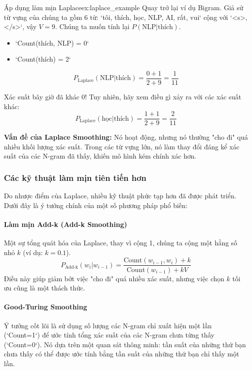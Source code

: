 \begin{example}{Áp dụng làm mịn Laplace}{ex:laplace_example}
    Quay trở lại ví dụ Bigram. Giả sử từ vựng của chúng ta gồm 6 từ: `tôi, thích, học, NLP, AI, rất, vui` cộng với `<s>, </s>`, vậy $V=9$.
    Chúng ta muốn tính lại $P(\text{NLP}|\text{thích})$.
    \begin{itemize}
        \item `Count(thích, NLP) = 0`
        \item `Count(thích) = 2`
    \end{itemize}
    
    $$ P_{\text{Laplace}}(\text{NLP} | \text{thích}) = \frac{0 + 1}{2 + 9} = \frac{1}{11} $$
    
    Xác suất bây giờ đã khác 0! Tuy nhiên, hãy xem điều gì xảy ra với các xác suất khác:
    $$ P_{\text{Laplace}}(\text{học} | \text{thích}) = \frac{1 + 1}{2 + 9} = \frac{2}{11} $$
    
    \textbf{Vấn đề của Laplace Smoothing:} Nó hoạt động, nhưng nó thường "cho đi" quá nhiều khối lượng xác suất. Trong các từ vựng lớn, nó làm thay đổi đáng kể xác suất của các N-gram đã thấy, khiến mô hình kém chính xác hơn.
\end{example}

\subsubsection{Các kỹ thuật làm mịn tiên tiến hơn}
Do nhược điểm của Laplace, nhiều kỹ thuật phức tạp hơn đã được phát triển. Dưới đây là ý tưởng chính của một số phương pháp phổ biến:

\paragraph{Làm mịn Add-k (Add-k Smoothing)}
Một sự tổng quát hóa của Laplace, thay vì cộng 1, chúng ta cộng một hằng số nhỏ $k$ (ví dụ: $k=0.1$).
$$ P_{\text{Add-k}}(w_i | w_{i-1}) = \frac{\text{Count}(w_{i-1}, w_i) + k}{\text{Count}(w_{i-1}) + kV} $$
Điều này giúp giảm bớt việc "cho đi" quá nhiều xác suất, nhưng việc chọn $k$ tối ưu cũng là một thách thức.

\paragraph{Good-Turing Smoothing}
Ý tưởng cốt lõi là sử dụng số lượng các N-gram chỉ xuất hiện một lần (`Count=1`) để ước tính tổng xác suất của các N-gram chưa từng thấy (`Count=0`). Nó dựa trên một quan sát thông minh: tần suất của những thứ bạn chưa thấy có thể được ước tính bằng tần suất của những thứ bạn chỉ thấy một lần.

